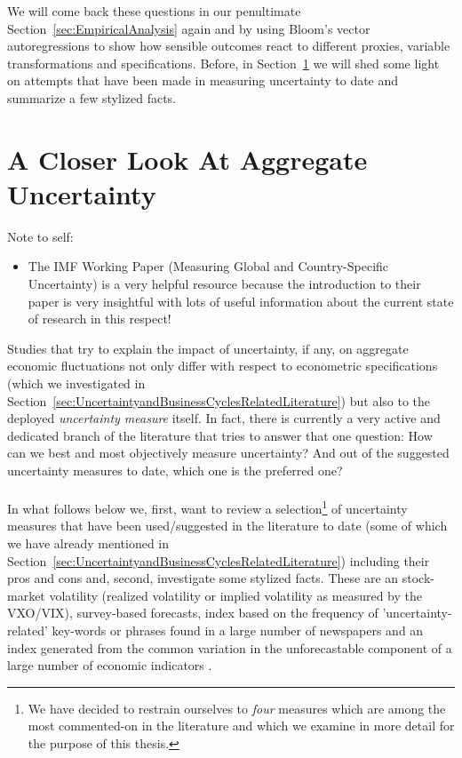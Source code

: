 \documentclass[a4paper,11pt,listof=nochaptergap,oneside,pointednumbers,bibtotoc,bigheadings,liststotoc]{scrbook}
\begin{document}
We will come back these questions in our penultimate Section~\ref{sec:EmpiricalAnalysis} again and by using Bloom's vector autoregressions to show how sensible outcomes react to different proxies, variable transformations and specifications. Before, in Section~\ref{MeasuringUncertaintyandaHistoricalView} we will shed some light on attempts that have been made in measuring uncertainty to date and summarize a few stylized facts.

\chapter{A Closer Look At Aggregate Uncertainty}
\label{MeasuringUncertaintyandaHistoricalView}

\begingroup
    \fontsize{8pt}{12pt}\selectfont
    Note to self:
\begin{itemize}
	\item  The IMF Working Paper (Measuring Global and Country-Specific Uncertainty) is a very helpful resource because the introduction to their paper is very insightful with lots of useful information about the current state of research in this respect!
\end{itemize}
\endgroup


Studies that try to explain the impact of uncertainty, if any, on aggregate economic fluctuations not only differ with respect to econometric specifications (which we investigated in Section~\ref{sec:UncertaintyandBusinessCyclesRelatedLiterature}) but also to the deployed \textit{uncertainty measure} itself. In fact, there is currently a very active and dedicated branch of the literature that tries to answer that one question: How can we best and most objectively measure uncertainty? And out of the suggested uncertainty measures to date, which one is the preferred one?\\
\\
In what follows below we, first, want to review a selection\footnote{We have decided to restrain ourselves to \textit{four} measures which are among the most commented-on in the literature and which we examine in more detail for the purpose of this thesis.} of uncertainty measures that have been used/suggested in the literature to date (some of which we have already mentioned in Section~\ref{sec:UncertaintyandBusinessCyclesRelatedLiterature}) including their pros and cons and, second, investigate some stylized facts. These are an stock-market volatility (realized volatility or implied volatility as measured by the VXO/VIX), survey-based forecasts, index based on the frequency of 'uncertainty-related' key-words or phrases found in a large number of newspapers \citep{bakeretal:15} and an index generated from the common variation in the unforecastable component of a large number of economic indicators \citep{juradoetal:15}.
\end{document}
